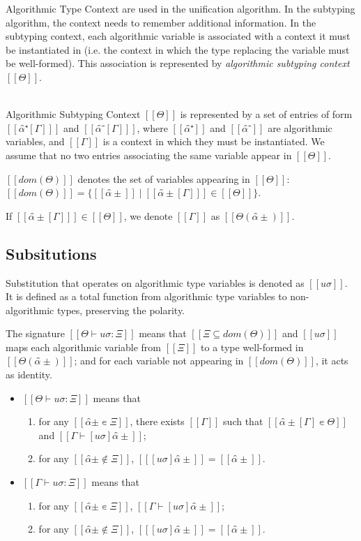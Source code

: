 \documentclass[a4,natbib=false]{article}
\begin{document}
Algorithmic Type Context are used in the unification algorithm.
In the subtyping algorithm, 
the context needs to remember additional information.
In the subtyping context, each algorithmic variable is associated with a
context it must be instantiated in 
(i.e. the context in which the type replacing the variable must be well-formed).
This association is represented by \emph{algorithmic subtyping context} $[[Θ]]$.
\begin{definition}
  \hfill \\
  Algorithmic Subtyping Context $[[Θ]]$ is represented by a set of 
  entries of form $[[ α̂⁺[Γ] ]]$ and $[[ α̂⁻[Γ] ]]$,
  where $[[α̂⁺]]$ and $[[α̂⁻]]$ are algorithmic variables,
  and $[[Γ]]$ is a context in which they must be instantiated.
  We assume that no two entries associating the same variable
  appear in $[[Θ]]$.

  $[[dom(Θ)]]$ denotes the set of variables appearing in $[[Θ]]$:
  $[[dom(Θ)]] = \{ [[α̂±]] \mid [[α̂±[Γ] ]] \in [[Θ]] \}$.


  If $[[ α̂±[Γ] ]] \in [[Θ]]$, we denote $[[Γ]]$ as $[[Θ(α̂±)]]$.
\end{definition}


\subsection{Subsitutions}

Substitution that operates on algorithmic type variables is denoted as
$[[uσ]]$. It is defined as a total function from algorithmic 
type variables to non-algorithmic types, preserving the polarity.

The signature $[[Θ ⊢ uσ : Ξ]]$ means that
$[[Ξ ⊆ dom(Θ)]]$ and 
$[[uσ]]$ maps each algorithmic variable 
from $[[Ξ]]$ to a type well-formed in $[[Θ(α̂±)]]$;
and for each variable not appearing in $[[dom(Θ)]]$, 
it acts as identity.

\begin{definition}
  \hfill
  \begin{itemize}
    \item $[[Θ ⊢ uσ : Ξ]]$ means that
      \begin{enumerate}
        \item for any $[[α̂± ∊ Ξ]]$,
          there exists $[[Γ]]$ such that $[[ α̂±[Γ] ∊ Θ ]]$
          and $[[ Γ ⊢ [uσ]α̂± ]]$; 
        \item for any $[[ α̂± ∉ Ξ]]$, $[[ [uσ]α̂± ]] =  [[ α̂± ]]$.
      \end{enumerate}
    \item $[[Γ ⊢ uσ : Ξ]]$ means that
      \begin{enumerate}
        \item for any $[[α̂± ∊ Ξ]]$, $[[ Γ ⊢ [uσ]α̂± ]]$; 
        \item for any $[[ α̂± ∉ Ξ]]$, $[[ [uσ]α̂± ]] =  [[ α̂± ]]$.
      \end{enumerate}
  \end{itemize}
\end{definition}
\end{document}
